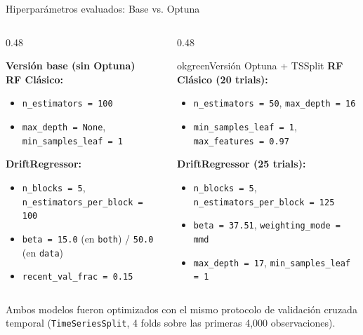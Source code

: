 \documentclass[aspectratio=169,11pt,table]{beamer}
\begin{document}
\begin{frame}{Hiperparámetros evaluados: Base vs. Optuna}
\begin{columns}[T,onlytextwidth]
\begin{column}{0.48\textwidth}
\begin{ccdebox}
\scriptsize
\textbf{Versión base (sin Optuna)}\\[0.08cm]
\textbf{RF Clásico:}
\begin{itemize}
  \item \texttt{n\_estimators = 100}
  \item \texttt{max\_depth = None}, \texttt{min\_samples\_leaf = 1}
\end{itemize}
\vspace{0.06cm}
\textbf{DriftRegressor:}
\begin{itemize}
  \item \texttt{n\_blocks = 5}, \texttt{n\_estimators\_per\_block = 100}
  \item \texttt{beta = 15.0} (en \texttt{both}) / \texttt{50.0} (en \texttt{data})
  \item \texttt{recent\_val\_frac = 0.15}
\end{itemize}
\end{ccdebox}
\end{column}

\begin{column}{0.48\textwidth}
\begin{contrastbox}{okgreen}{Versión Optuna + TSSplit}
\scriptsize
\textbf{RF Clásico (20 trials):}
\begin{itemize}
  \item \texttt{n\_estimators = 50}, \texttt{max\_depth = 16}
  \item \texttt{min\_samples\_leaf = 1}, \texttt{max\_features = 0.97}
\end{itemize}
\vspace{0.06cm}
\textbf{DriftRegressor (25 trials):}
\begin{itemize}
  \item \texttt{n\_blocks = 5}, \texttt{n\_estimators\_per\_block = 125}
  \item \texttt{beta = 37.51}, \texttt{weighting\_mode = mmd}
  \item \texttt{max\_depth = 17}, \texttt{min\_samples\_leaf = 1}
\end{itemize}
\end{contrastbox}
\end{column}
\end{columns}

\vspace{0.12cm}
\begin{keybox}
\scriptsize
Ambos modelos fueron optimizados con el mismo protocolo de validación cruzada temporal (\texttt{TimeSeriesSplit}, 4 folds sobre las primeras 4,000 observaciones).
\end{keybox}
\end{frame}
\end{document}
